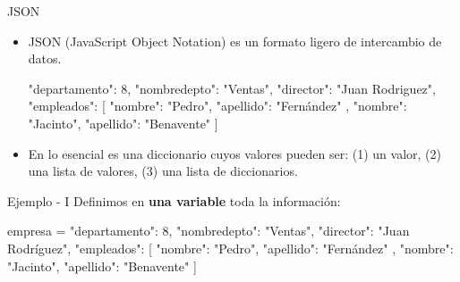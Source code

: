 \documentclass[10pt, envcountsect , spanish]{beamer}
\begin{document}
\begin{frame}[fragile]{JSON} 
\begin{itemize}
\item JSON (JavaScript Object Notation) es un formato ligero de intercambio de datos.

\begin{pyverbatim}
{
    "departamento": 8,
    "nombredepto": "Ventas",
    "director": "Juan Rodriguez",
    "empleados": [
        {
            "nombre": "Pedro",
            "apellido": "Fernández"
        },
        {
            "nombre": "Jacinto",
            "apellido": "Benavente"
        }
    ]
}
\end{pyverbatim}

\item En lo esencial es una diccionario cuyos valores pueden ser: (1) un valor, (2) una lista de valores, (3) una lista de diccionarios.
\end{itemize}
\end{frame}




\begin{frame}[fragile]{Ejemplo - I} 
Definimos en \textbf{una variable} toda la información:

\begin{pyconsole}[][frame=single]%

empresa = {
  "departamento": 8,
  "nombredepto": "Ventas",
  "director": "Juan Rodríguez",
  "empleados": [
  {
    "nombre": "Pedro",
    "apellido": "Fernández"
  }, {
    "nombre": "Jacinto",
    "apellido": "Benavente"
  }
  ]
}
\end{pyconsole}
\end{frame}
\end{document}
